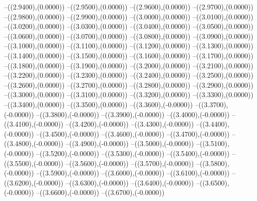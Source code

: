 {	--({\sx*(2.9400)},{\sy*(0.0000)})
	--({\sx*(2.9500)},{\sy*(0.0000)})
	--({\sx*(2.9600)},{\sy*(0.0000)})
	--({\sx*(2.9700)},{\sy*(0.0000)})
	--({\sx*(2.9800)},{\sy*(0.0000)})
	--({\sx*(2.9900)},{\sy*(0.0000)})
	--({\sx*(3.0000)},{\sy*(0.0000)})
	--({\sx*(3.0100)},{\sy*(0.0000)})
	--({\sx*(3.0200)},{\sy*(0.0000)})
	--({\sx*(3.0300)},{\sy*(0.0000)})
	--({\sx*(3.0400)},{\sy*(0.0000)})
	--({\sx*(3.0500)},{\sy*(0.0000)})
	--({\sx*(3.0600)},{\sy*(0.0000)})
	--({\sx*(3.0700)},{\sy*(0.0000)})
	--({\sx*(3.0800)},{\sy*(0.0000)})
	--({\sx*(3.0900)},{\sy*(0.0000)})
	--({\sx*(3.1000)},{\sy*(0.0000)})
	--({\sx*(3.1100)},{\sy*(0.0000)})
	--({\sx*(3.1200)},{\sy*(0.0000)})
	--({\sx*(3.1300)},{\sy*(0.0000)})
	--({\sx*(3.1400)},{\sy*(0.0000)})
	--({\sx*(3.1500)},{\sy*(0.0000)})
	--({\sx*(3.1600)},{\sy*(0.0000)})
	--({\sx*(3.1700)},{\sy*(0.0000)})
	--({\sx*(3.1800)},{\sy*(0.0000)})
	--({\sx*(3.1900)},{\sy*(0.0000)})
	--({\sx*(3.2000)},{\sy*(0.0000)})
	--({\sx*(3.2100)},{\sy*(0.0000)})
	--({\sx*(3.2200)},{\sy*(0.0000)})
	--({\sx*(3.2300)},{\sy*(0.0000)})
	--({\sx*(3.2400)},{\sy*(0.0000)})
	--({\sx*(3.2500)},{\sy*(0.0000)})
	--({\sx*(3.2600)},{\sy*(0.0000)})
	--({\sx*(3.2700)},{\sy*(0.0000)})
	--({\sx*(3.2800)},{\sy*(0.0000)})
	--({\sx*(3.2900)},{\sy*(0.0000)})
	--({\sx*(3.3000)},{\sy*(0.0000)})
	--({\sx*(3.3100)},{\sy*(0.0000)})
	--({\sx*(3.3200)},{\sy*(0.0000)})
	--({\sx*(3.3300)},{\sy*(0.0000)})
	--({\sx*(3.3400)},{\sy*(0.0000)})
	--({\sx*(3.3500)},{\sy*(0.0000)})
	--({\sx*(3.3600)},{\sy*(-0.0000)})
	--({\sx*(3.3700)},{\sy*(-0.0000)})
	--({\sx*(3.3800)},{\sy*(-0.0000)})
	--({\sx*(3.3900)},{\sy*(-0.0000)})
	--({\sx*(3.4000)},{\sy*(-0.0000)})
	--({\sx*(3.4100)},{\sy*(-0.0000)})
	--({\sx*(3.4200)},{\sy*(-0.0000)})
	--({\sx*(3.4300)},{\sy*(-0.0000)})
	--({\sx*(3.4400)},{\sy*(-0.0000)})
	--({\sx*(3.4500)},{\sy*(-0.0000)})
	--({\sx*(3.4600)},{\sy*(-0.0000)})
	--({\sx*(3.4700)},{\sy*(-0.0000)})
	--({\sx*(3.4800)},{\sy*(-0.0000)})
	--({\sx*(3.4900)},{\sy*(-0.0000)})
	--({\sx*(3.5000)},{\sy*(-0.0000)})
	--({\sx*(3.5100)},{\sy*(-0.0000)})
	--({\sx*(3.5200)},{\sy*(-0.0000)})
	--({\sx*(3.5300)},{\sy*(-0.0000)})
	--({\sx*(3.5400)},{\sy*(-0.0000)})
	--({\sx*(3.5500)},{\sy*(-0.0000)})
	--({\sx*(3.5600)},{\sy*(-0.0000)})
	--({\sx*(3.5700)},{\sy*(-0.0000)})
	--({\sx*(3.5800)},{\sy*(-0.0000)})
	--({\sx*(3.5900)},{\sy*(-0.0000)})
	--({\sx*(3.6000)},{\sy*(-0.0000)})
	--({\sx*(3.6100)},{\sy*(-0.0000)})
	--({\sx*(3.6200)},{\sy*(-0.0000)})
	--({\sx*(3.6300)},{\sy*(-0.0000)})
	--({\sx*(3.6400)},{\sy*(-0.0000)})
	--({\sx*(3.6500)},{\sy*(-0.0000)})
	--({\sx*(3.6600)},{\sy*(-0.0000)})
	--({\sx*(3.6700)},{\sy*(-0.0000)})
}
